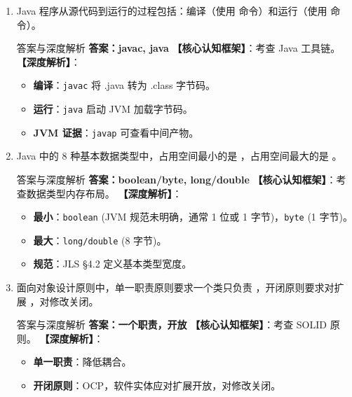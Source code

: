 ﻿\documentclass[12pt, a4paper]{ctexart}
\newcommand{\blank}{\underline{\hspace{2cm}}}
\newcommand{\code}[1]{\texttt{#1}}
\begin{document}
\begin{enumerate}[label=\arabic*., itemsep=1.5em]
	\item Java 程序从源代码到运行的过程包括：编译（使用 \blank 命令）和运行（使用 \blank 命令）。
	      \begin{bluebox}{答案与深度解析}
		      \textbf{答案：javac, java}
		      \textbf{【核心认知框架】}：考查 Java 工具链。
		      \textbf{【深度解析】}：
		      \begin{itemize}[leftmargin=*, nosep]
			      \item \textbf{编译}：\code{javac} 将 .java 转为 .class 字节码。
			      \item \textbf{运行}：\code{java} 启动 JVM 加载字节码。
			      \item \textbf{JVM 证据}：\code{javap} 可查看中间产物。
		      \end{itemize}
	      \end{bluebox}

	\item Java 中的 8 种基本数据类型中，占用空间最小的是 \blank，占用空间最大的是 \blank。
	      \begin{bluebox}{答案与深度解析}
		      \textbf{答案：boolean/byte, long/double}
		      \textbf{【核心认知框架】}：考查数据类型内存布局。
		      \textbf{【深度解析】}：
		      \begin{itemize}[leftmargin=*, nosep]
			      \item \textbf{最小}：\code{boolean} (JVM 规范未明确，通常 1 位或 1 字节)，\code{byte} (1 字节)。
			      \item \textbf{最大}：\code{long/double} (8 字节)。
			      \item \textbf{规范}：JLS §4.2 定义基本类型宽度。
		      \end{itemize}
	      \end{bluebox}

	\item 面向对象设计原则中，单一职责原则要求一个类只负责 \blank，开闭原则要求对扩展 \blank，对修改关闭。
	      \begin{bluebox}{答案与深度解析}
		      \textbf{答案：一个职责，开放}
		      \textbf{【核心认知框架】}：考查 SOLID 原则。
		      \textbf{【深度解析】}：
		      \begin{itemize}[leftmargin=*, nosep]
			      \item \textbf{单一职责}：降低耦合。
			      \item \textbf{开闭原则}：OCP，软件实体应对扩展开放，对修改关闭。
		      \end{itemize}
	      \end{bluebox}


\end{enumerate}
\end{document}
